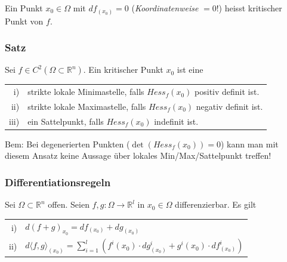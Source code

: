 \documentclass[a4paper, fontsize = 8pt, landscape]{scrartcl}
\newcommand{\R}[0]{\mathbb{R}}
\begin{document}
\begin{multicols*}{3}
    Ein Punkt $x_0 \in \Omega$ mit $df_{(x_0)} = 0$ (\emph{Koordinatenweise} $= 0$!) heisst kritischer Punkt von $f$.

    \subsubsection{Satz}

    Sei $f \in C^2(\Omega \subset \R^n)$. Ein kritischer Punkt $x_0$ ist eine

    \begin{center}
        \begin{tabular}{r l} \toprule
            i)   & \hspace*{-10pt} strikte lokale Minimastelle, falls $Hess_f (x_0)$ positiv definit ist. \\
            ii)  & \hspace*{-10pt} strikte lokale Maximastelle, falls $Hess_f (x_0)$ negativ definit ist. \\
            iii) & \hspace*{-10pt} ein Sattelpunkt, falls $Hess_f (x_0)$ indefinit ist.                   \\
            \bottomrule
        \end{tabular}
    \end{center}

    Bem: Bei degenerierten Punkten ($\det(Hess_f (x_0)) = 0$) kann man mit diesem Ansatz keine Aussage über lokales Min/Max/Sattelpunkt treffen!


    \subsubsection{Differentiationsregeln}

    Sei $\Omega \subset \R^n$ offen. Seien $f,g: \Omega \to \R^l$ in $x_0 \in \Omega$ differenzierbar. Es gilt

    \begin{center}
        \begin{tabular}{r l} \toprule
            i)  & \hspace*{-10pt} $d(f + g)_{x_0} = df_{(x_0)} + dg_{(x_0)}$                                                                                                \\
            ii) & \hspace*{-10pt} $d \langle f, g \rangle_{(x_0)} = \sum\limits_{i = 1}^l \left( f^{i}(x_0) \cdot dg^{i}_{(x_0)} + g^{i}(x_0) \cdot df^{i}_{(x_0)} \right)$ \\
            \bottomrule
        \end{tabular}
    \end{center}


\end{multicols*}
\end{document}

